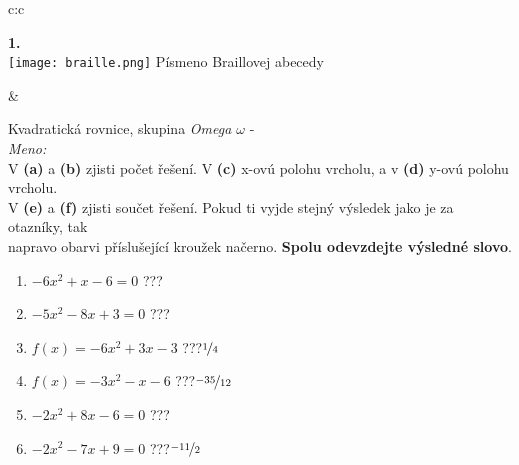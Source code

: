 \documentclass[10pt]{report}
\begin{document}
\begin{tabular}{c:c}
\begin{minipage}[c][99mm][t]{0.49\linewidth}
\begin{center}
\begin{minipage}{0.20\linewidth}
\begin{center}
{\Huge\bfseries 1.} \\[2mm]
\texttt{[image: braille.png]}
{\small Písmeno Braillovej abecedy}
\end{center}
\end{minipage}
\end{center}
\end{minipage}
&
\begin{minipage}[c][99mm][t]{0.49\linewidth}
\begin{center}
\vspace{7mm}
{\huge Kvadratická rovnice, skupina \textit{Omega $\omega$} -}\\[4.5mm]
\textit{Meno:}\phantom{xxxxxxxxxxxxxxxxxxxxxxxxxxxxxxxxxxxxxxxxxxxxxxxxxxxxxxxxxxxxxxxxx}\\[3.5mm]
V \textbf{(a)} a \textbf{(b)} zjisti počet řešení. V \textbf{(c)} x-ovú polohu vrcholu, a v \textbf{(d)} y-ovú polohu vrcholu.\\V \textbf{(e)} a \textbf{(f)} zjisti součet řešení. Pokud ti vyjde stejný výsledek jako je za otazníky, tak\\napravo obarvi příslušející kroužek načerno. \textbf{Spolu odevzdejte výsledné slovo}.\\[3mm]
\begin{minipage}{0.77\linewidth}
\begin{center}
\begin{varwidth}{\textwidth}
\begin{enumerate}
\large
\item $-6x^2+x-6=0$\quad \dotfill\; ???\;\dotfill {}
\item $-5x^2-8x+3=0$\quad \dotfill\; ???\;\dotfill {}
\item $f(x)=-6x^2+3x-3$\quad \dotfill\; ???\;\dotfill \quad $\nicefrac{1}{4}$
\item $f(x)=-3x^2-x-6$\quad \dotfill\; ???\;\dotfill \quad $\nicefrac{-35}{12}$
\item $-2x^2+8x-6=0$\quad \dotfill\; ???\;\dotfill {}
\item $-2x^2-7x+9=0$\quad \dotfill\; ???\;\dotfill \quad $\nicefrac{-11}{2}$
\end{enumerate}
\end{varwidth}
\end{center}
\end{minipage}
\begin{minipage}{0.20\linewidth}

\end{minipage}
\end{center}
\end{minipage}
\end{tabular}
\end{document}
